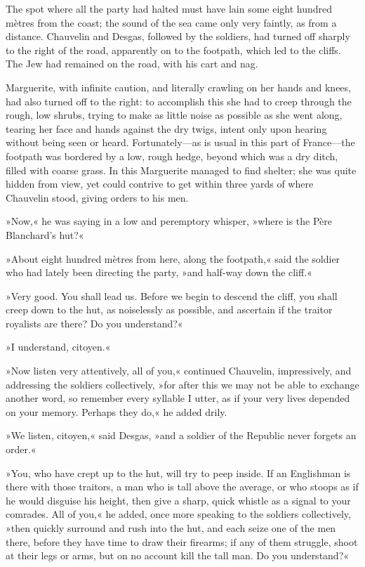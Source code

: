 The spot where all the party had halted must have lain some eight hundred mètres from the coast; the sound of the sea came only very faintly, as from a distance. Chauvelin and Desgas, followed by the soldiers, had turned off sharply to the right of the road, apparently on to the footpath, which led to the cliffs. The Jew had remained on the road, with his cart and nag.

Marguerite, with infinite caution, and literally crawling on her hands and knees, had also turned off to the right: to accomplish this she had to creep through the rough, low shrubs, trying to make as little noise as possible as she went along, tearing her face and hands against the dry twigs, intent only upon hearing without being seen or heard. Fortunately—as is usual in this part of France—the footpath was bordered by a low, rough hedge, beyond which was a dry ditch, filled with coarse grass. In this Marguerite managed to find shelter; she was quite hidden from view, yet could contrive to get within three yards of where Chauvelin stood, giving orders to his men.

»Now,« he was saying in a low and peremptory whisper, »where is the Père Blanchard's hut?«

»About eight hundred mètres from here, along the footpath,« said the soldier who had lately been directing the party, »and half-way down the cliff.«

»Very good. You shall lead us. Before we begin to descend the cliff, you shall creep down to the hut, as noiselessly as possible, and ascertain if the traitor royalists are there? Do you understand?«

»I understand, citoyen.«

»Now listen very attentively, all of you,« continued Chauvelin, impressively, and addressing the soldiers collectively, »for after this we may not be able to exchange another word, so remember every syllable I utter, as if your very lives depended on your memory. Perhaps they do,« he added drily.

»We listen, citoyen,« said Desgas, »and a soldier of the Republic never forgets an order.«

»You, who have crept up to the hut, will try to peep inside. If an Englishman is there with those traitors, a man who is tall above the average, or who stoops as if he would disguise his height, then give a sharp, quick whistle as a signal to your comrades. All of you,« he added, once more speaking to the soldiers collectively, »then quickly surround and rush into the hut, and each seize one of the men there, before they have time to draw their firearms; if any of them struggle, shoot at their legs or arms, but on no account kill the tall man. Do you understand?«

